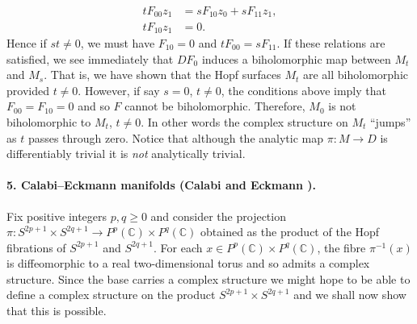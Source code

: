 \[
\begin{aligned}
tF_{00}z_1&=sF_{10}z_0+sF_{11}z_1,\\
tF_{10}z_1&=0.
\end{aligned}
\]
Hence if $st\neq0$, we must have $F_{10}=0$ and $tF_{00}=sF_{11}$. If these relations are satisfied, we see immediately that $DF_0$ induces a biholomorphic map between $M_t$ and $M_s$. That is, we have shown that the Hopf surfaces $M_t$ are all biholomorphic provided $t\neq0$. However, if say $s=0$, $t\neq0$, the
conditions above imply that $F_{00}=F_{10}=0$ and so $F$ cannot be biholomorphic. Therefore, $M_0$ is not biholomorphic to $M_t$, $t\neq0$. In other words the complex structure on $M_t$ ``jumps'' as $t$ passes through zero. Notice that although the analytic map $\pi:M\longrightarrow D$ is differentiably trivial it is \emph{not} analytically trivial.

\paragraph*{5. Calabi--Eckmann manifolds (Calabi and Eckmann \cite{bib:I:calabi-e-and-eckmann-b:1}).} Fix positive integers $p,q\geq0$ and consider the projection $\pi:S^{2p+1}\times S^{2q+1}\longrightarrow P^p(\mathbb C)\times P^q(\mathbb C)$ obtained as the product of the Hopf fibrations of $S^{2p+1}$ and $S^{2q+1}$. For each $x\in P^p(\mathbb C)\times P^q(\mathbb C)$, the fibre $\pi^{-1}(x)$ is diffeomorphic to a real two-dimensional torus and so admits a complex structure. Since the base carries a complex structure we might hope to be able to define a complex structure on the product $S^{2p+1}\times S^{2q+1}$ and we shall now show that this is possible.

